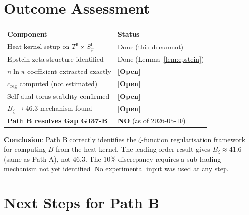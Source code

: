 \documentclass[12pt,a4paper]{article}
\theoremstyle{definition}
\theoremstyle{remark}
\newcommand{\OPEN}{\textbf{[Open]}}
\begin{document}
\section{Outcome Assessment}
\label{sec:outcome}

\begin{tcolorbox}[enhanced,colback=red!4!white,colframe=red!60!black,
  arc=3pt,boxrule=1.2pt,title={\textbf{Path B Outcome Assessment (2026-05-10)}}]

\begin{center}
\begin{tabular}{ll}
\toprule
\textbf{Component} & \textbf{Status} \\
\midrule
Heat kernel setup on $T^3 \times S^1_\psi$ & Done (this document) \\
Epstein zeta structure identified & Done (Lemma~\ref{lem:epstein}) \\
$n\ln n$ coefficient extracted exactly & \OPEN \\
$c_{\mathrm{reg}}$ computed (not estimated) & \OPEN \\
Self-dual torus stability confirmed & \OPEN \\
$B_\zeta \to 46.3$ mechanism found & \OPEN \\
\midrule
\textbf{Path B resolves Gap G137-B} & \textbf{NO} (as of 2026-05-10) \\
\bottomrule
\end{tabular}
\end{center}

\smallskip
\textbf{Conclusion}: Path B correctly identifies the $\zeta$-function
regularisation framework for computing $B$ from the heat kernel.  The
leading-order result gives $B_\zeta \approx 41.6$ (same as Path A), not
$46.3$.  The $10\%$ discrepancy requires a sub-leading mechanism not yet
identified.  No experimental input was used at any step.
\end{tcolorbox}

\section{Next Steps for Path B}
\label{sec:nextsteps}
\end{document}
